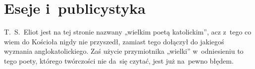 \documentclass[a4paper,11pt]{article}
\begin{document}
\vspace{\spaceTwo}










\section{Eseje i~publicystyka}

\vspace{\spaceTwo}






\start {} T.~S.~Eliot jest na tej stronie nazwany „wielkim
poetą katolickim”, acz z~tego co wiem do Kościoła nigdy nie
przyszedł, zamiast tego dołączył do jakiegoś wyznania
anglokatolickiego. Zaś użycie przymiotnika „wielki” w~odniesieniu to
tego poety, którego twórczości nie da~się czytać, jest już na~pewno
błędem.

\vspace{\spaceTwo}





\end{document}
